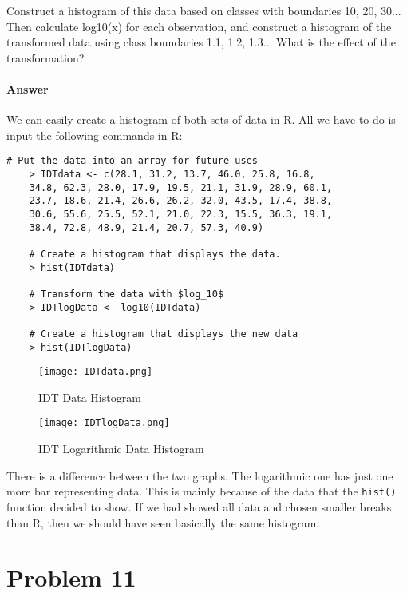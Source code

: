\documentclass{article}
\begin{document}
	\noindent Construct a histogram of this data based on classes with boundaries 10, 20, 30... 
	Then calculate log10(x) for each observation, and construct a histogram of the transformed data 
	using class boundaries 1.1, 1.2, 1.3... What is the effect of the transformation?
	
	\paragraph{Answer}
	We can easily create a histogram of both sets of data in R. All we have to do is input the 
	following commands in R:
	
	\begin{lstlisting}[frame=single]
    # Put the data into an array for future uses
    > IDTdata <- c(28.1, 31.2, 13.7, 46.0, 25.8, 16.8,
    34.8, 62.3, 28.0, 17.9, 19.5, 21.1, 31.9, 28.9, 60.1,
    23.7, 18.6, 21.4, 26.6, 26.2, 32.0, 43.5, 17.4, 38.8,
    30.6, 55.6, 25.5, 52.1, 21.0, 22.3, 15.5, 36.3, 19.1,
    38.4, 72.8, 48.9, 21.4, 20.7, 57.3, 40.9)
    
    # Create a histogram that displays the data.
    > hist(IDTdata)
    
    # Transform the data with $log_10$
    > IDTlogData <- log10(IDTdata)
    
    # Create a histogram that displays the new data
    > hist(IDTlogData)
	\end{lstlisting}
	
	\begin{figure}[!htb]
		\centering
		\texttt{[image: IDTdata.png]}
		\caption{IDT Data Histogram}
		\label{fig:IDT_data_hist}
	\end{figure}
	
	\begin{figure}[!htb]
		\centering
		\texttt{[image: IDTlogData.png]}
		\caption{IDT Logarithmic Data Histogram}
		\label{fig:IDT_log_data_hist}
	\end{figure}
	
	There is a difference between the two graphs. The logarithmic one has just one more bar 
	representing data. This is mainly because of the data that the \texttt{hist()} function decided to 
	show. If we had showed all data and chosen smaller breaks than R, then we should have seen 
	basically the same histogram.

\clearpage
\section*{Problem 11}
\end{document}

